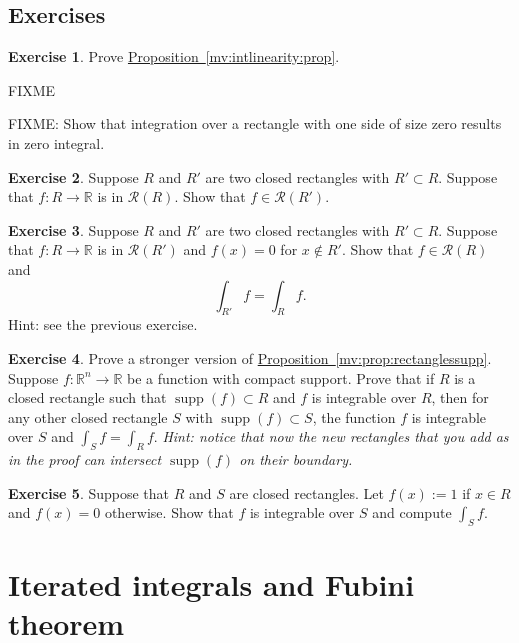 \documentclass[12pt]{book}
\newcommand{\R}{{\mathbb{R}}}
\newcommand{\sR}{{\mathcal{R}}}
\newcommand{\sectionnewpage}{\clearpage}
\theoremstyle{plain}
\theoremstyle{remark}
\theoremstyle{definition}
\theoremstyle{exercise}
\newtheorem{exercise}{Exercise}[section]
\theoremstyle{example}
\newcommand{\propref}[1]{\hyperref[#1]{Proposition~\ref*{#1}}}
\begin{document}
\subsection{Exercises}

\begin{exercise}
Prove \propref{mv:intlinearity:prop}.
\end{exercise}


FIXME

FIXME: Show that integration over a rectangle with one side of size
zero results in zero integral.

\begin{exercise} \label{mv:exersmallerset}
Suppose $R$ and $R'$ are two closed rectangles with $R' \subset R$.  Suppose
that $f \colon R \to \R$ is in $\sR(R)$.  Show that $f \in \sR(R')$.
\end{exercise}

\begin{exercise} \label{mv:zerooutside}
Suppose $R$ and $R'$ are two closed rectangles with $R' \subset R$.  Suppose
that $f \colon R \to \R$ is in $\sR(R')$ and $f(x) = 0$ for $x \notin R'$.
Show that $f \in \sR(R)$ and
\begin{equation*}
\int_{R'} f = \int_R f .
\end{equation*}
Hint: see the previous exercise.
\end{exercise}

\begin{exercise}
Prove a stronger version of \propref{mv:prop:rectanglessupp}.
Suppose $f \colon \R^n \to \R$ be a function with compact support.
Prove that
if $R$ is a closed rectangle such that $\operatorname{supp}(f) \subset R$
and $f$ is integrable over $R$, then for any other closed rectangle
$S$ with $\operatorname{supp}(f) \subset S$,
the function $f$ is integrable over $S$ and
$\int_S f = \int_R f$.
\emph{Hint: notice that now the new rectangles that you add as in the proof
can intersect $\operatorname{supp}(f)$ on their boundary.}
\end{exercise}

\begin{exercise}
Suppose that $R$ and $S$ are closed rectangles.  Let $f(x) := 1$ if 
$x \in R$ and $f(x) = 0$ otherwise.  Show that $f$ is integrable over $S$
and compute $\int_S f$.
\end{exercise}


\sectionnewpage
\section{Iterated integrals and Fubini theorem}
\label{sec:iteratedints}
\end{document}
